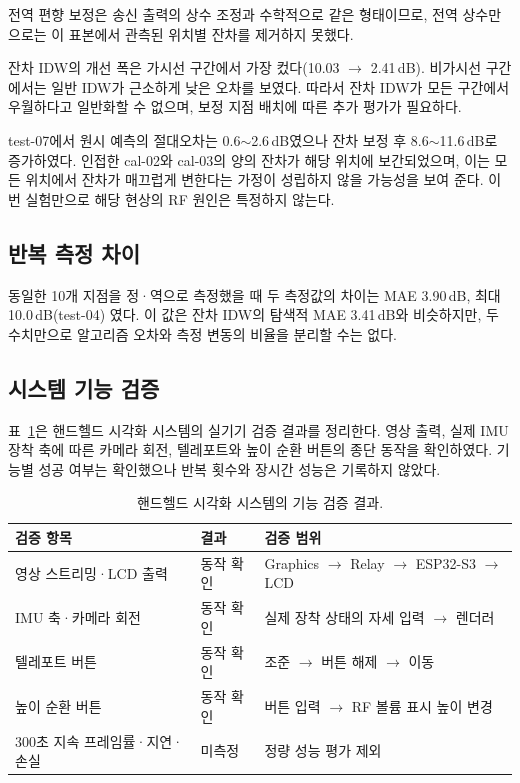 \documentclass[11pt,a4paper]{article}
\begin{document}
전역 편향 보정은 송신 출력의 상수 조정과 수학적으로 같은 형태이므로, 전역 상수만으로는 이 표본에서 관측된
위치별 잔차를 제거하지 못했다.

잔차 IDW의 개선 폭은 가시선 구간에서 가장 컸다(10.03 $\rightarrow$ 2.41\,dB). 비가시선 구간에서는
일반 IDW가 근소하게 낮은 오차를 보였다. 따라서 잔차 IDW가 모든 구간에서 우월하다고 일반화할 수 없으며,
보정 지점 배치에 따른 추가 평가가 필요하다.

test-07에서 원시 예측의 절대오차는 0.6$\sim$2.6\,dB였으나 잔차 보정 후 8.6$\sim$11.6\,dB로
증가하였다. 인접한 cal-02와 cal-03의 양의 잔차가 해당 위치에 보간되었으며, 이는 모든 위치에서 잔차가
매끄럽게 변한다는 가정이 성립하지 않을 가능성을 보여 준다. 이번 실험만으로 해당 현상의 RF 원인은 특정하지
않는다.

\subsection{반복 측정 차이}

동일한 10개 지점을 정·역으로 측정했을 때 두 측정값의 차이는 MAE 3.90\,dB, 최대 10.0\,dB(test-04)
였다. 이 값은 잔차 IDW의 탐색적 MAE 3.41\,dB와 비슷하지만, 두 수치만으로 알고리즘 오차와 측정 변동의
비율을 분리할 수는 없다.

\subsection{시스템 기능 검증}

표~\ref{tab:sys}은 핸드헬드 시각화 시스템의 실기기 검증 결과를 정리한다. 영상 출력, 실제 IMU 장착 축에
따른 카메라 회전, 텔레포트와 높이 순환 버튼의 종단 동작을 확인하였다. 기능별 성공 여부는 확인했으나 반복
횟수와 장시간 성능은 기록하지 않았다.

\begin{table}[htbp]
  \centering\small
  \caption{핸드헬드 시각화 시스템의 기능 검증 결과.}
  \label{tab:sys}
  \begin{tabularx}{\textwidth}{@{}p{4.6cm} p{2.2cm} X@{}}
    \toprule
    검증 항목 & 결과 & 검증 범위 \\
    \midrule
    영상 스트리밍·LCD 출력 & 동작 확인 & Graphics $\rightarrow$ Relay $\rightarrow$ ESP32-S3 $\rightarrow$ LCD \\
    IMU 축·카메라 회전 & 동작 확인 & 실제 장착 상태의 자세 입력 $\rightarrow$ 렌더러 \\
    텔레포트 버튼 & 동작 확인 & 조준 $\rightarrow$ 버튼 해제 $\rightarrow$ 이동 \\
    높이 순환 버튼 & 동작 확인 & 버튼 입력 $\rightarrow$ RF 볼륨 표시 높이 변경 \\
    300초 지속 프레임률·지연·손실 & 미측정 & 정량 성능 평가 제외 \\
    \bottomrule
  \end{tabularx}
\end{table}
\end{document}

